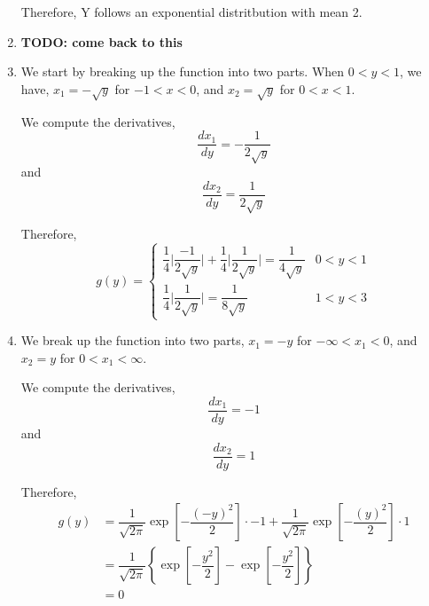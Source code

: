 \documentclass{article}
\newcommand\todo[1]{\textbf{TODO: #1}}%
\begin{document}
\begin{enumerate}
      Therefore, Y follows an exponential distritbution with mean 2.
     
     \item
      \todo{come back to this}
     \addtocounter{enumi}{3}
     
     \item
      We start by breaking up the function into two parts. When $0 < y < 1$, we have, 
      $x_1 = -\sqrt{y}$ for $-1 < x < 0$, and $x_2 = \sqrt{y}$ for $0 < x < 1$.
      
      We compute the derivatives,
      $$\dfrac{dx_1}{dy} = -\dfrac{1}{2\sqrt{y}}$$
      and
      $$\dfrac{dx_2}{dy} = \dfrac{1}{2\sqrt{y}}$$
      
      Therefore,
      \[ g(y) = 
	  \begin{cases}
	    \dfrac{1}{4} \Big|\dfrac{-1}{2\sqrt{y}}\Big| + \dfrac{1}{4} \Big|\dfrac{1}{2\sqrt{y}}\Big| 
	    = \dfrac{1}{4\sqrt{y}} & 0 < y < 1 \\
	    \dfrac{1}{4} \Big|\dfrac{1}{2\sqrt{y}}\Big| = \dfrac{1}{8\sqrt{y}} & 1 < y < 3
         \end{cases}
      \]
     \addtocounter{enumi}{3}
     
     \item
      We break up the function into two parts, $x_1 = -y$ for $-\infty < x_1 < 0$, and $x_2 = y$
      for $0 < x_1 < \infty$.
      
      We compute the derivatives,
      $$\dfrac{dx_1}{dy} = -1$$
      and
      $$\dfrac{dx_2}{dy} = 1$$
      
      Therefore,
      \begin{align*}
       g(y) &= \dfrac{1}{\sqrt{2\pi}}\exp\left[-\dfrac{(-y)^2}{2}\right]\cdot -1 + 
	\dfrac{1}{\sqrt{2\pi}}\exp\left[-\dfrac{(y)^2}{2}\right]\cdot 1 \\
	&= \dfrac{1}{\sqrt{2\pi}} \left\{\exp\left[-\dfrac{y^2}{2}\right] - \exp\left[-\dfrac{y^2}{2}\right]\right\} \\
	&= 0
      \end{align*}
    \end{enumerate}
\end{document}
